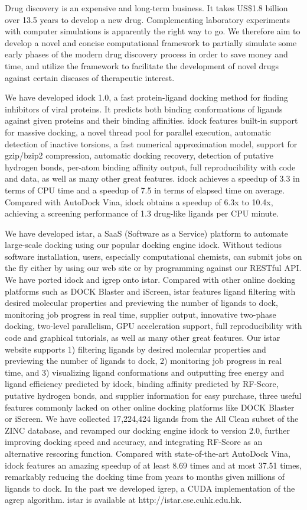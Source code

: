 Drug discovery is an expensive and long-term business. It takes US\$1.8 billion over 13.5 years to develop a new drug. Complementing laboratory experiments with computer simulations is apparently the right way to go. We therefore aim to develop a novel and concise computational framework to partially simulate some early phases of the modern drug discovery process in order to save money and time, and utilize the framework to facilitate the development of novel drugs against certain diseases of therapeutic interest.

We have developed idock 1.0, a fast protein-ligand docking method for finding inhibitors of viral proteins. It predicts both binding conformations of ligands against given proteins and their binding affinities. idock features built-in support for massive docking, a novel thread pool for parallel execution, automatic detection of inactive torsions, a fast numerical approximation model, support for gzip/bzip2 compression, automatic docking recovery, detection of putative hydrogen bonds, per-atom binding affinity output, full reproducibility with code and data, as well as many other great features. idock achieves a speedup of 3.3 in terms of CPU time and a speedup of 7.5 in terms of elapsed time on average. Compared with AutoDock Vina, idock obtains a speedup of 6.3x to 10.4x, achieving a screening performance of 1.3 drug-like ligands per CPU minute.

We have developed istar, a SaaS (Software as a Service) platform to automate large-scale docking using our popular docking engine idock. Without tedious software installation, users, especially computational chemists, can submit jobs on the fly either by using our web site or by programming against our RESTful API. We have ported idock and igrep onto istar. Compared with other online docking platforms such as DOCK Blaster and iScreen, istar features ligand filtering with desired molecular properties and previewing the number of ligands to dock, monitoring job progress in real time, supplier output, innovative two-phase docking, two-level parallelism, GPU acceleration support, full reproducibility with code and graphical tutorials, as well as many other great features. Our istar website supports 1) filtering ligands by desired molecular properties and previewing the number of ligands to dock, 2) monitoring job progress in real time, and 3) visualizing ligand conformations and outputting free energy and ligand efficiency predicted by idock, binding affinity predicted by RF-Score, putative hydrogen bonds, and supplier information for easy purchase, three useful features commonly lacked on other online docking platforms like DOCK Blaster or iScreen. We have collected 17,224,424 ligands from the All Clean subset of the ZINC database, and revamped our docking engine idock to version 2.0, further improving docking speed and accuracy, and integrating RF-Score as an alternative rescoring function. Compared with state-of-the-art AutoDock Vina, idock features an amazing speedup of at least 8.69 times and at most 37.51 times, remarkably reducing the docking time from years to months given millions of ligands to dock. In the past we developed igrep, a CUDA implementation of the agrep algorithm. istar is available at http://istar.cse.cuhk.edu.hk.

